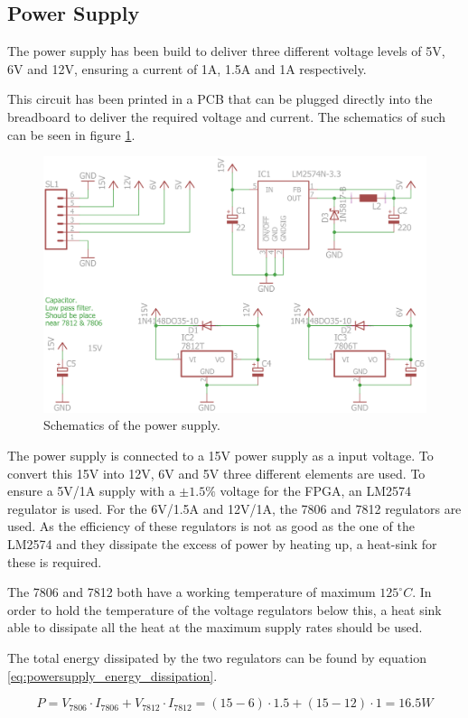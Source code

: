 
\subsection{Power Supply}
The power supply has been build to deliver three different voltage levels of 5V, 6V and 12V, ensuring a current of 1A, 1.5A and 1A respectively.

This circuit has been printed in a PCB that can be plugged directly into the breadboard to deliver the required voltage and current.
The schematics of such can be seen in figure \ref{fig:powersupply_schematics}.

\begin{figure}[H]
\centering 
\includegraphics[width = 0.7 \textwidth]{images/powersupply_schematics}
\caption{Schematics of the power supply.}
\label{fig:powersupply_schematics}
\end{figure}


The power supply is connected to a 15V power supply as a input voltage. 
To convert this 15V into 12V, 6V and 5V three different elements are used.
To ensure a 5V/1A supply with a $\pm 1.5\%$ voltage for the FPGA, an LM2574 regulator is used. 
For the 6V/1.5A and 12V/1A, the 7806 and 7812 regulators are used. 
As the efficiency of these regulators is not as good as the one of the LM2574 and they dissipate the excess of power by heating up, a heat-sink for these is required.

The 7806 and 7812 both have a working temperature of maximum $125^{\circ} C$.
In order to hold the temperature of the voltage regulators below this, a heat sink able to dissipate all the heat at the maximum supply rates should be used.

The total energy dissipated by the two regulators can be found by equation \ref{eq:powersupply_energy_dissipation}.

\begin{equation}
P = V_{7806} \cdot I_{7806} + V_{7812} \cdot I_{7812} = (15 - 6) \cdot 1.5 + (15 - 12) \cdot 1 = 16.5W
\label{eq:powersupply_energy_dissipation}
\end{equation}


